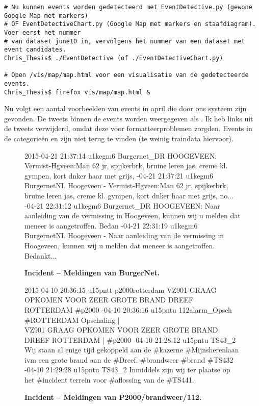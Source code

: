 {{\begin{lstlisting}
# Nu kunnen events worden gedetecteerd met EventDetective.py (gewone Google Map met markers) 
# OF EventDetectiveChart.py (Google Map met markers en staafdiagram). Voer eerst het nummer 
# van dataset june10 in, vervolgens het nummer van een dataset met event candidates.
Chris_Thesis$ ./EventDetective (of ./EventDetectiveChart.py)

# Open /vis/map/map.html voor een visualisatie van de gedetecteerde events.
Chris_Thesis$ firefox vis/map/map.html &
\end{lstlisting}
\vspace*{\fill}
\newpage

Nu volgt een aantal voorbeelden van events in april die door ons systeem zijn gevonden. De tweets binnen de events worden
weergegeven als . Ik heb links uit de tweets verwijderd, omdat deze voor formatteerproblemen
zorgden. Events in de categorie\"en  en  zijn niet terug te vinden (te weinig traindata hiervoor).

\begin{figure}[H]
 \caption{\bf{Incident} – Meldingen van BurgerNet.}\label{voorbeelden}
\vspace*{-10pt} 
\begin{framed}
\footnotesize{
2015-04-21 21:37:14 u1kegm6 Burgernet\_DR HOOGEVEEN: Vermist-Hgveen:Man 62 jr, spijkerbrk, bruine leren jas, creme kl. gympen, kort dnker haar met grijs,
-04-21 21:37:21 u1kegm6 BurgernetNL Hoogeveen - Vermist-Hgveen:Man 62 jr, spijkerbrk, bruine leren jas, creme kl. gympen, kort dnker haar met grijs, no...
-04-21 22:31:12 u1kegm6 Burgernet\_DR HOOGEVEEN: Naar aanleiding van de vermissing in Hoogeveen, kunnen wij u melden dat meneer is aangetroffen. Bedan
-04-21 22:31:19 u1kegm6 BurgernetNL Hoogeveen - Naar aanleiding van de vermissing in Hoogeveen, kunnen wij u melden dat meneer is aangetroffen. Bedankt...
}
\end{framed}
\end{figure}

\vspace*{-17pt} 
\begin{figure}[H]
 \caption{\bf{Incident} – Meldingen van P2000/brandweer/112.}
\vspace*{-10pt} 
\begin{framed}
\footnotesize{
2015-04-10 20:36:15 u15pntt p2000rotterdam VZ901 GRAAG OPKOMEN VOOR ZEER GROTE BRAND DREEF ROTTERDAM \#p2000
-04-10 20:36:16 u15pntu 112alarm\_Opsch \#ROTTERDAM Opschaling | \\VZ901 GRAAG OPKOMEN VOOR ZEER GROTE BRAND DREEF ROTTERDAM | \#p2000
-04-10 21:28:12 u15pntu TS43\_2 Wij staan al enige tijd gekoppeld aan de \#kazerne \#Mijnsherenlaan ivm een grote brand aan de \#Dreef. \#brandweer \#brand \#TS432
-04-10 21:29:28 u15pntu TS43\_2 Inmiddels zijn wij ter plaatse op het \#incident terrein voor \#aflossing van de \#TS441.
}
\end{framed}
\end{figure}

}}
